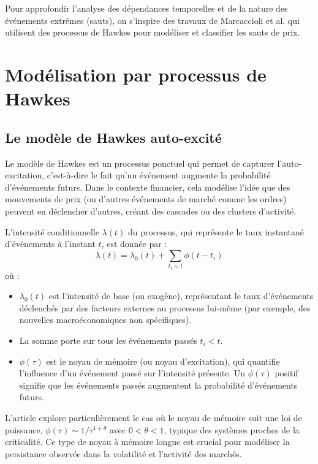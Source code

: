 \documentclass[10pt,a4paper]{article}
\theoremstyle{definition}
\theoremstyle{remark}
\begin{document}
\begin{itemize}
Pour approfondir l'analyse des dépendances temporelles et de la nature des événements extrêmes (sauts), on s'inspire des travaux de Marcaccioli et al. \cite{marcaccioli2021exogenous} qui utilisent des processus de Hawkes pour modéliser et classifier les sauts de prix.


\newpage
\section{Modélisation par processus de Hawkes}

    

    \subsection{Le modèle de Hawkes auto-excité}

    Le modèle de Hawkes est un processus ponctuel qui permet de capturer l'auto-excitation, c'est-à-dire le fait qu'un événement augmente la probabilité d'événements futurs. Dans le contexte financier, cela modélise l'idée que des mouvements de prix (ou d'autres événements de marché comme les ordres) peuvent en déclencher d'autres, créant des cascades ou des clusters d'activité.

    L'intensité conditionnelle $\lambda(t)$ du processus, qui représente le taux instantané d'événements à l'instant $t$, est donnée par \cite{marcaccioli2021exogenous} :
    \begin{equation}
    \lambda(t) = \lambda_0(t) + \sum_{t_i < t} \phi(t-t_i)
    \end{equation}
    où :
    \begin{itemize}
        \item $\lambda_0(t)$ est l'intensité de base (ou exogène), représentant le taux d'événements déclenchés par des facteurs externes au processus lui-même (par exemple, des nouvelles macroéconomiques non spécifiques).
        \item La somme porte sur tous les événements passés $t_i < t$.
        \item $\phi(\tau)$ est le noyau de mémoire (ou noyau d'excitation), qui quantifie l'influence d'un événement passé sur l'intensité présente. Un $\phi(\tau)$ positif signifie que les événements passés augmentent la probabilité d'événements futurs.
    \end{itemize}

    L'article \cite{marcaccioli2021exogenous} explore particulièrement le cas où le noyau de mémoire suit une loi de puissance, $\phi(\tau) \sim 1/\tau^{1+\theta}$ avec $0 < \theta < 1$, typique des systèmes proches de la criticalité. Ce type de noyau à mémoire longue est crucial pour modéliser la persistance observée dans la volatilité et l'activité des marchés.


\end{itemize}
\end{document}
